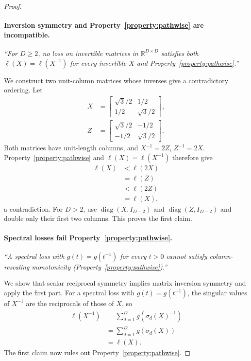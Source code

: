 \begin{proof}
\paragraph{Inversion symmetry and Property~\ref{property:pathwise} are incompatible.}
\emph{``For $D\geq2$, no loss on invertible matrices in $\mathbb R^{D\times D}$ satisfies both $\ell(X)=\ell(X^{-1})$ for every invertible $X$ and Property~\ref{property:pathwise}.''}

We construct two unit-column matrices whose inverses give a contradictory ordering.
Let
\begin{align}
X&=\begin{bmatrix}\sqrt3/2&1/2\\1/2&\sqrt3/2\end{bmatrix}, \\
Z&=\begin{bmatrix}\sqrt3/2&-1/2\\-1/2&\sqrt3/2\end{bmatrix}.
\end{align}
Both matrices have unit-length columns, and $X^{-1}=2Z$, $Z^{-1}=2X$.
Property~\ref{property:pathwise} and $\ell(X)=\ell(X^{-1})$ therefore give
\begin{align}
\ell(X)&<\ell(2X) \\
&=\ell(Z) \\
&<\ell(2Z) \\
&=\ell(X),
\end{align}
a contradiction.
For $D>2$, use $\operatorname{diag}(X,I_{D-2})$ and $\operatorname{diag}(Z,I_{D-2})$ and double only their first two columns.
This proves the first claim.

\paragraph{Spectral losses fail Property~\ref{property:pathwise}.}
\emph{``A spectral loss with $g(t)=g(t^{-1})$ for every $t>0$ cannot satisfy column-rescaling monotonicity (Property~\ref{property:pathwise}).''}

We show that scalar reciprocal symmetry implies matrix inversion symmetry and apply the first part.
For a spectral loss with $g(t)=g(t^{-1})$, the singular values of $X^{-1}$ are the reciprocals of those of $X$, so
\begin{align}
\ell(X^{-1})
&=\sum_{d=1}^D g(\sigma_d(X)^{-1}) \\
&=\sum_{d=1}^D g(\sigma_d(X)) \\
&=\ell(X).
\end{align}
The first claim now rules out Property~\ref{property:pathwise}.


\end{proof}
